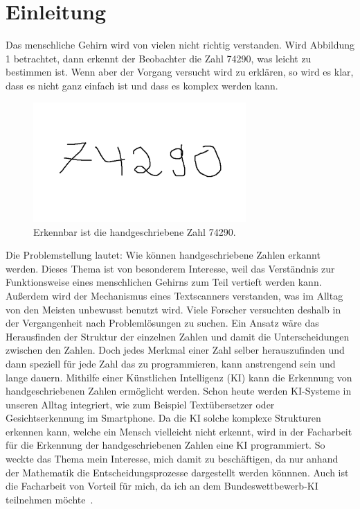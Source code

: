 \documentclass[11pt]{article}
\begin{document}
\section{Einleitung}
Das menschliche Gehirn wird von vielen nicht richtig verstanden. Wird Abbildung 1 betrachtet, dann erkennt der Beobachter die Zahl 74290,
was leicht zu bestimmen ist. Wenn aber der Vorgang versucht wird zu erklären, so wird es klar, dass es nicht ganz einfach ist
und dass es komplex werden kann.
\begin{figure}[h]
    \centering
    \includegraphics[width=230pt, keepaspectratio]{images/zahlen}
    \caption[Handgeschriebene Zahl 74290]{Erkennbar ist die handgeschriebene Zahl 74290.}
\end{figure}
Die Problemstellung lautet: Wie können handgeschriebene Zahlen erkannt werden.
Dieses Thema ist von besonderem Interesse, weil das Verständnis zur Funktionsweise eines menschlichen Gehirns zum Teil vertieft werden kann.
Außerdem wird der Mechanismus eines Textscanners verstanden, was im Alltag von den Meisten unbewusst benutzt wird.
Viele Forscher versuchten deshalb in der Vergangenheit nach Problemlösungen zu suchen. Ein Ansatz wäre das Herausfinden
der Struktur der einzelnen Zahlen und damit die Unterscheidungen zwischen den Zahlen.
Doch jedes Merkmal einer Zahl selber herauszufinden und dann speziell für jede Zahl das zu programmieren, kann
anstrengend sein und lange dauern. Mithilfe einer Künstlichen Intelligenz (KI) kann die Erkennung von handgeschriebenen Zahlen ermöglicht werden. 
Schon heute werden KI-Systeme in unseren Alltag integriert, wie zum Beispiel Textübersetzer oder Gesichtserkennung im Smartphone. Da die KI solche
komplexe Strukturen erkennen kann, welche ein Mensch vielleicht nicht erkennt, wird in der Facharbeit für die Erkennung der handgeschriebenen Zahlen eine KI programmiert.
So weckte das Thema mein Interesse, mich damit zu beschäftigen, da nur anhand der Mathematik die Entscheidungsprozesse dargestellt werden könnnen.
Auch ist die Facharbeit von Vorteil für mich, da ich an dem Bundeswettbewerb-KI teilnehmen möchte~\cite{10}.
\end{document}
